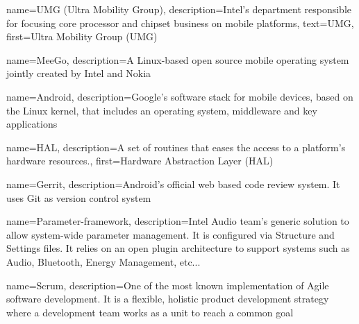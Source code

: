 

%

{
  name=UMG (Ultra Mobility Group),
  description={Intel's department responsible for focusing core
    processor and chipset business on mobile platforms},
  text=UMG,
  first=Ultra Mobility Group (UMG)
}

{
  name=MeeGo\textsuperscript{\texttrademark},
  description={A Linux-based open source mobile operating system
    jointly created by Intel and Nokia}
}

{
  name=Android\textsuperscript{\texttrademark},
  description={Google's software stack for mobile devices, based on
  the Linux kernel, that includes an operating system, middleware and
  key applications}
}

{
  name=HAL,
  description={A set of routines that eases the access to a
  platform's hardware resources.},
  first=Hardware Abstraction Layer (HAL)
}

{
  name=Gerrit,
  description={Android's official web based code review system.
  It uses Git as version control system}
}

{
  name=Parameter-framework,
  description={Intel Audio team's generic solution to allow system-wide
  parameter management. It is configured via Structure and Settings files.
  It relies on an open plugin architecture to support systems such as Audio,
  Bluetooth, Energy Management, etc...
  }
}

{
  name=Scrum,
  description={One of the most known implementation of Agile software development.
  It is a flexible, holistic product development strategy where a development team
  works as a unit to reach a common goal}
}

